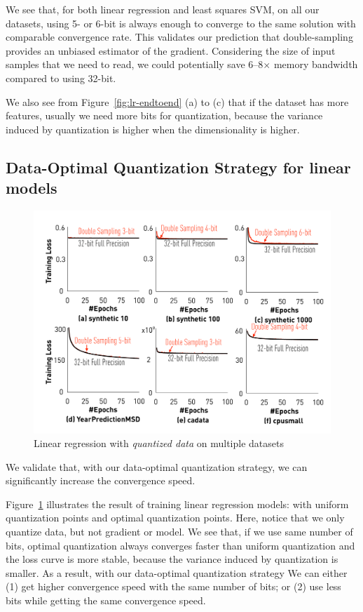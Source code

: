 \documentclass{article}
\begin{document}
We see that, for both linear regression 
and least squares SVM,
on all our datasets,
using 5- or 6-bit is always enough
to converge to the same solution
with comparable convergence rate. 
This validates our prediction that
double-sampling provides an
unbiased estimator of the gradient.
Considering the size of input
samples that we need to read, we
could potentially save 6--8$\times$ 
memory bandwidth compared to using 
32-bit. 

We also see from Figure~\ref{fig:lr-endtoend} (a) to (c) that if the dataset has more
features, usually we need more bits for quantization,
because the variance induced by quantization
is higher when the dimensionality is higher.

\subsection{Data-Optimal Quantization Strategy for linear models}
\begin{figure}[t]
\centering
    \includegraphics[width=1\columnwidth]{final-experiments/lr-data}
    
\caption{Linear regression with \emph{quantized data} on multiple datasets}
\label{fig:lr-qd}
\end{figure}


We validate that, with our data-optimal quantization strategy, we can 
significantly increase the convergence speed.

Figure~\ref{fig:lr-qd} illustrates
the result of training linear regression models: 
with uniform quantization points and 
optimal quantization points. Here, notice that we only quantize data,
but not gradient or model.
We see that, if we use same number of bits, optimal quantization
always converges faster than uniform quantization and the loss curve
is more stable, because the variance induced by quantization is smaller. 
As a result, with our data-optimal quantization strategy
We can either (1) get higher convergence speed
with the same number of bits;
or (2) use less bits while getting the same convergence speed. 
\end{document}
